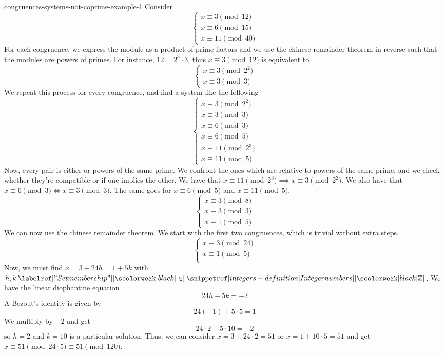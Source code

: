 \documentclass[preview]{standalone}
\begin{document}
\begin{snippetexample}{congruences-systems-not-coprime-example-1}{}
    Consider
    \[
        \begin{cases}
            x \equiv 3 \pmod{12} \\
            x \equiv 6 \pmod{15} \\
            x \equiv 11 \pmod{40}
        \end{cases}
    \]
    For each congruence, we express the module as a product of prime factors
    and we use the chinese remainder theorem in reverse such that the modules
    are powers of primes. For instance, \(12 = 2^3 \cdot 3\), thus \(x \equiv 3 \pmod{12}\)
    is equivalent to
    \[
        \begin{cases}
            x \equiv 3 \pmod{2^2} \\
            x \equiv 3 \pmod{3}
        \end{cases}
    \]
    We repeat this process for every congruence, and find a system like the following
    \[
        \begin{cases}
            x \equiv 3 \pmod{2^2} \\
            x \equiv 3 \pmod{3} \\
            x \equiv 6 \pmod{3} \\
            x \equiv 6 \pmod{5} \\
            x \equiv 11 \pmod{2^3} \\
            x \equiv 11 \pmod{5}
        \end{cases}
    \]
    Now, every pair is either \coprime or powers of the same prime.
    We confront the ones which are relative to powers of the same prime,
    and we check whether they're compatible or if one implies the other.
    We have that \(x\equiv 11 \pmod{2^3} \implies x \equiv 3 \pmod{2^2}\).
    We also have that \(x \equiv 6 \pmod{3} \iff x \equiv 3 \pmod{3}\).
    The same goes for \(x \equiv 6 \pmod{5}\) and \(x \equiv 11 \pmod{5}\).
    \[
        \begin{cases}
            x \equiv 3 \pmod{8} \\
            x \equiv 3 \pmod{3} \\
            x \equiv 1 \pmod{5}
        \end{cases}
    \]
    We can now use the chinese remainder theorem.
    We start with the first two congruences, which is trivial without extra steps.
    \[
        \begin{cases}
            x \equiv 3 \pmod{24} \\
            x \equiv 1 \pmod{5} \\
        \end{cases}
    \]
    Now, we must find \(x=3+24h = 1 + 5k\) with \(h,k \in \integers\).
    We have the linear diophantine equation
    \[ 24h - 5k = -2 \]
    A Bezout's identity is given by
    \[
        24(-1) + 5\cdot 5 = 1
    \]
    We multiply by \(-2\) and get
    \[
        24\cdot 2 - 5\cdot 10 = -2
    \]
    so \(h=2\) and \(k=10\) is a particular solution.
    Thus, we can consider \(x = 3 + 24\cdot 2 = 51\) or \(x = 1 + 10\cdot 5 = 51\)
    and get \(x \equiv 51 \pmod{24\cdot 5} \equiv 51 \pmod{120}\).
\end{snippetexample}
\end{document}

